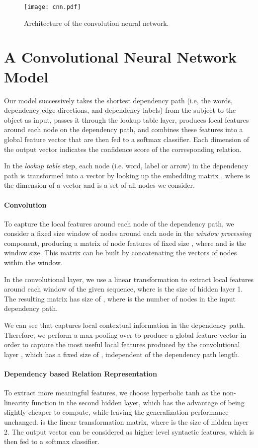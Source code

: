 \documentclass[11pt,a4paper]{article}
\begin{document}
\begin{figure}[htp!]
\centering\texttt{[image: cnn.pdf]} 
\caption{ \label{cnn} Architecture of the convolution neural network.}
\end{figure}
\section{A Convolutional Neural Network Model}


Our model successively takes the shortest dependency path (i.e, the words, dependency edge directions, and dependency labels) from the subject  to the object  as input, passes it through the lookup table layer, produces local features around each node on the dependency path, and combines these features into a global feature vector that are then fed to a softmax classifier. Each dimension of the output vector
indicates the confidence score of the corresponding relation.

In the \textit{lookup table} step, each node (i.e. word, label or arrow) in the dependency path is transformed into a vector by looking up the embedding matrix , where  is the dimension of a vector and  is a set of all nodes we consider.

\paragraph{Convolution}
To capture the local features around each node of the dependency path, we consider a fixed size window of nodes around each node in the \textit{window processing} component, producing a matrix of node features of fixed size , where  and  is the window size. This matrix can be built by concatenating the vectors of nodes within the window. 

In the convolutional layer, we use a linear transformation   to extract local features around each window of the given sequence, where  is the size of hidden layer 1. 
The resulting matrix   has size of , where  is the number of nodes in the input dependency path.

We can see that  captures local contextual information in the dependency path. 
Therefore, we perform a max pooling over   to produce a global feature vector in order to capture the 
most useful local features produced by the convolutional layer  \cite{DBLP:journals/jmlr/CollobertWBKKK11}, which has a fixed size of , 
 independent of the dependency path length.


\paragraph{Dependency based Relation Representation}
To extract more meaningful features, we choose hyperbolic tanh as the non-linearity function in the second hidden layer, which has the advantage of being slightly cheaper to compute, while leaving the generalization performance unchanged.  is the linear transformation matrix, where  is the size of hidden layer 2. The output vector can be considered as higher level syntactic features, which is then fed to a softmax classifier.
\end{document}
